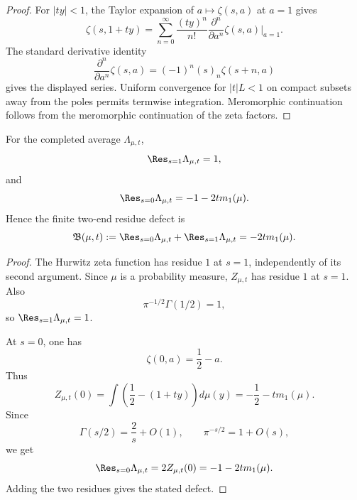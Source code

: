\begin{proof}
For \(|ty|<1\), the Taylor expansion of \(a\mapsto \zeta(s,a)\) at \(a=1\) gives
\[
   \zeta(s,1+ty)=\sum_{n=0}^\infty
   \frac{(ty)^n}{n!}\frac{\partial^n}{\partial a^n}\zeta(s,a)\Big|_{a=1}.
\]
The standard derivative identity
\[
   \frac{\partial^n}{\partial a^n}\zeta(s,a)=(-1)^n(s)_n\zeta(s+n,a)
\]
gives the displayed series.  Uniform convergence for \(|t|L<1\) on compact subsets away from the poles permits termwise integration.  Meromorphic continuation follows from the meromorphic continuation of the zeta factors.
\end{proof}

\begin{theorem}\label{thm:completed-residues}
For the completed average \(\Lambda_{\mu,t}\),
\[
   \Res_{s=1}\Lambda_{\mu,t}=1,
\]
and
\[
   \Res_{s=0}\Lambda_{\mu,t}=-1-2t m_1(\mu).
\]
Hence the finite two-end residue defect is
\[
   \mathfrak B(\mu,t):=\Res_{s=0}\Lambda_{\mu,t}+\Res_{s=1}\Lambda_{\mu,t}
   =-2t m_1(\mu).
\]
\end{theorem}

\begin{proof}
The Hurwitz zeta function has residue \(1\) at \(s=1\), independently of its second argument.  Since \(\mu\) is a probability measure, \(Z_{\mu,t}\) has residue \(1\) at \(s=1\).  Also
\[
   \pi^{-1/2}\Gamma(1/2)=1,
\]
so \(\Res_{s=1}\Lambda_{\mu,t}=1\).

At \(s=0\), one has
\[
   \zeta(0,a)=\frac12-a.
\]
Thus
\[
   Z_{\mu,t}(0)=\int\left(\frac12-(1+ty)\right)d\mu(y)
   =-\frac12-tm_1(\mu).
\]
Since
\[
   \Gamma(s/2)=\frac2s+O(1),
   \qquad
   \pi^{-s/2}=1+O(s),
\]
we get
\[
   \Res_{s=0}\Lambda_{\mu,t}=2Z_{\mu,t}(0)=-1-2tm_1(\mu).
\]
Adding the two residues gives the stated defect.
\end{proof}
